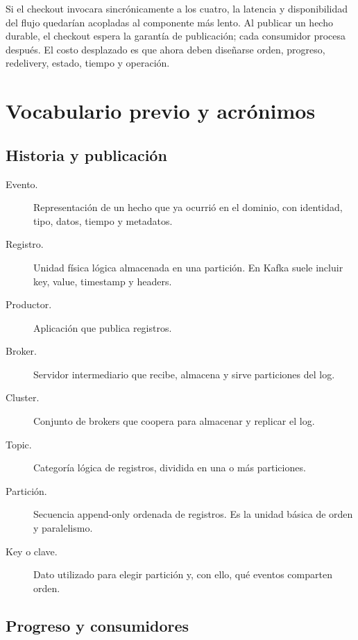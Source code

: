 \documentclass[variant=apuntes,cover=institutional,mode=screen]{ua-engineering-v6-article}
\begin{document}
Si el checkout invocara sincrónicamente a los cuatro, la latencia y disponibilidad del flujo quedarían acopladas al componente más lento. Al publicar un hecho durable, el checkout espera la garantía de publicación; cada consumidor procesa después. El costo desplazado es que ahora deben diseñarse orden, progreso, redelivery, estado, tiempo y operación.

\section{Vocabulario previo y acrónimos}

\subsection{Historia y publicación}

\begin{description}
\item[Evento.] Representación de un hecho que ya ocurrió en el dominio, con identidad, tipo, datos, tiempo y metadatos.
\item[Registro.] Unidad física lógica almacenada en una partición. En Kafka suele incluir key, value, timestamp y headers.
\item[Productor.] Aplicación que publica registros.
\item[Broker.] Servidor intermediario que recibe, almacena y sirve particiones del log.
\item[Cluster.] Conjunto de brokers que coopera para almacenar y replicar el log.
\item[Topic.] Categoría lógica de registros, dividida en una o más particiones.
\item[Partición.] Secuencia append-only ordenada de registros. Es la unidad básica de orden y paralelismo.
\item[Key o clave.] Dato utilizado para elegir partición y, con ello, qué eventos comparten orden.
\end{description}

\subsection{Progreso y consumidores}
\end{document}
